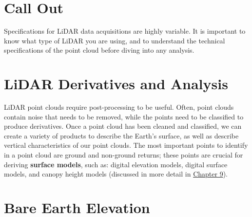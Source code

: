 \documentclass[
]{book}
\begin{document}
\hypertarget{call-out-3}{%
\section*{Call Out}\label{call-out-3}}

Specifications for LiDAR data acquisitions are highly variable. It is important to know what type of LiDAR you are using, and to understand the technical specifications of the point cloud before diving into any analysis.

\hypertarget{lidar-derivatives-and-analysis}{%
\section{LiDAR Derivatives and Analysis}\label{lidar-derivatives-and-analysis}}

LiDAR point clouds require post-processing to be useful. Often, point clouds contain noise that needs to be removed, while the points need to be classified to produce derivatives. Once a point cloud has been cleaned and classified, we can create a variety of products to describe the Earth's surface, as well as describe vertical characteristics of our point clouds. The most important points to identify in a point cloud are ground and non-ground returns; these points are crucial for deriving \textbf{surface models}, such as: digital elevation models, digital surface models, and canopy height models (discussed in more detail in \href{https://ubc-geomatics-textbook.github.io/geomatics-textbook/raster-analysis-and-terrain-modelling.html}{Chapter 9}).

\hypertarget{bare-earth-elevation}{%
\section{Bare Earth Elevation}\label{bare-earth-elevation}}
\end{document}
